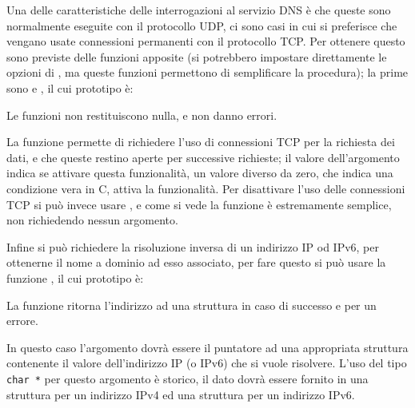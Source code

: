 Una delle caratteristiche delle interrogazioni al servizio DNS è che queste
sono normalmente eseguite con il protocollo UDP, ci sono casi in cui si
preferisce che vengano usate connessioni permanenti con il protocollo TCP. Per
ottenere questo sono previste delle funzioni apposite (si potrebbero impostare
direttamente le opzioni di , ma queste funzioni
permettono di semplificare la procedura); la prime sono  e
, il cui prototipo è:

\begin{funcproto}{
}

{Le funzioni non restituiscono nulla, e non danno errori.}
\end{funcproto}

La funzione  permette di richiedere l'uso di connessioni TCP
per la richiesta dei dati, e che queste restino aperte per successive
richieste; il valore dell'argomento  indica se attivare questa
funzionalità, un valore diverso da zero, che indica una condizione vera in C,
attiva la funzionalità.  Per disattivare l'uso delle connessioni TCP si può
invece usare , e come si vede la funzione è estremamente
semplice, non richiedendo nessun argomento.

Infine si può richiedere la risoluzione inversa di un indirizzo IP od IPv6,
per ottenerne il nome a dominio ad esso associato, per fare questo si può
usare la funzione , il cui prototipo è:

\begin{funcproto}{
}

{La funzione ritorna l'indirizzo ad una struttura  in caso di
  successo e  per un errore.}
\end{funcproto}

In questo caso l'argomento  dovrà essere il puntatore ad una
appropriata struttura contenente il valore dell'indirizzo IP (o IPv6) che si
vuole risolvere. L'uso del tipo \texttt{char *} per questo argomento è
storico, il dato dovrà essere fornito in una struttura  per
un indirizzo IPv4 ed una struttura  per un indirizzo IPv6.

